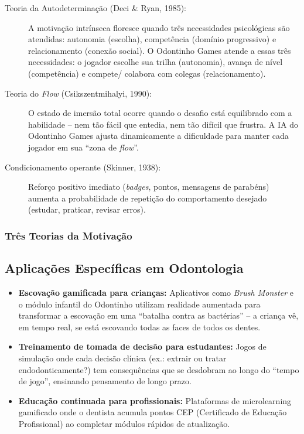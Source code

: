 \begin{description}
  \item[Teoria da Autodeterminação (Deci \& Ryan, 1985):] A motivação intrínseca
    floresce quando três necessidades psicológicas são atendidas: autonomia
    (escolha), competência (domínio progressivo) e relacionamento (conexão
    social). O Odontinho Games atende a essas três necessidades: o jogador
    escolhe sua trilha (autonomia), avança de nível (competência) e compete/
    colabora com colegas (relacionamento).

  \item[Teoria do \textit{Flow} (Csikszentmihalyi, 1990):] O estado de
    imersão total ocorre quando o desafio está equilibrado com a habilidade --
    nem tão fácil que entedia, nem tão difícil que frustra. A IA do Odontinho
    Games ajusta dinamicamente a dificuldade para manter cada jogador em sua
    ``zona de \textit{flow}''.

  \item[Condicionamento operante (Skinner, 1938):] Reforço positivo imediato
    (\textit{badges}, pontos, mensagens de parabéns) aumenta a probabilidade de
    repetição do comportamento desejado (estudar, praticar, revisar erros).
\end{description}

\subsubsection{Três Teorias da Motivação}

\subsection{Aplicações Específicas em Odontologia}

\begin{itemize}
  \item \textbf{Escovação gamificada para crianças:} Aplicativos como
    \textit{Brush Monster} e o módulo infantil do Odontinho utilizam realidade
    aumentada para transformar a escovação em uma ``batalha contra as bactérias''
    -- a criança vê, em tempo real, se está escovando todas as faces de todos
    os dentes.

  \item \textbf{Treinamento de tomada de decisão para estudantes:} Jogos de
    simulação onde cada decisão clínica (ex.: extrair ou tratar
    endodonticamente?) tem consequências que se desdobram ao longo do ``tempo
    de jogo'', ensinando pensamento de longo prazo.

  \item \textbf{Educação continuada para profissionais:} Plataformas de
    microlearning gamificado onde o dentista acumula pontos CEP (Certificado
    de Educação Profissional) ao completar módulos rápidos de atualização.
\end{itemize}

